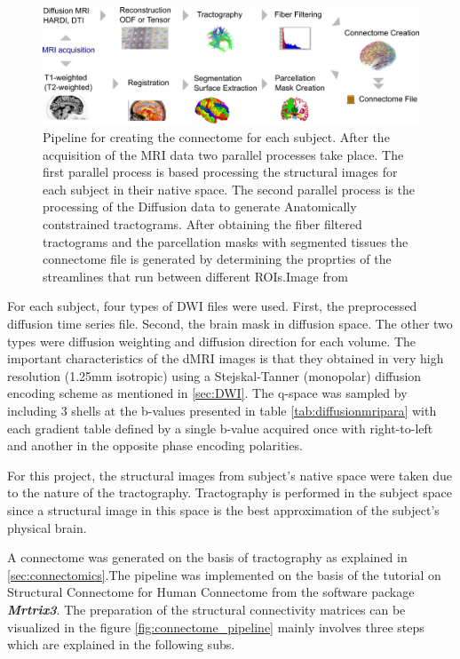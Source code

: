 \documentclass[msthesis.tex]{subfiles}
\begin{document}
\begin{figure}
    \centering
    \includegraphics[width=\textwidth]{images/connectome_creation_workflow.png}
    \caption{Pipeline for creating the connectome for each subject. After the acquisition of the MRI data two parallel processes take place. The first parallel process is based processing the structural images for each subject in their native space. The second parallel process is the processing of the Diffusion data to generate Anatomically contstrained tractograms. After obtaining the fiber filtered tractograms and the parcellation masks with segmented tissues the connectome file is generated by determining the proprties of the streamlines that run between different ROIs.Image from \cite{gerhard2011connectome}}
    \label{fig:connectome_pipeline}
\end{figure}


For each subject, four types of  DWI files were used. First, the preprocessed diffusion time series file. Second, the brain mask in diffusion space. The other two types were diffusion weighting and diffusion direction for each volume. The important characteristics of the dMRI images is that they obtained in very high resolution (1.25mm isotropic) using a Stejskal-Tanner (monopolar) diffusion encoding scheme as mentioned in  \autoref{sec:DWI}. The q-space was sampled by including 3 shells at the b-values presented in table \autoref{tab:diffusionmripara} with each gradient table defined by a single b-value acquired once with right-to-left and another in the opposite phase encoding polarities. 

For this project, the structural images from subject's native space were taken due to the nature of the tractography. Tractography is performed in the subject space since a structural image in this space is the best approximation of the subject's physical brain. 

A connectome was generated on the basis of tractography as explained in  \autoref{sec:connectomics}.The pipeline was implemented on the basis of the tutorial on Structural Connectome for Human Connectome from the software package \textbf{\textit{Mrtrix3}}. The preparation of the structural connectivity matrices can be visualized in the figure \autoref{fig:connectome_pipeline} mainly involves three steps which are explained in the following subs.
\end{document}
